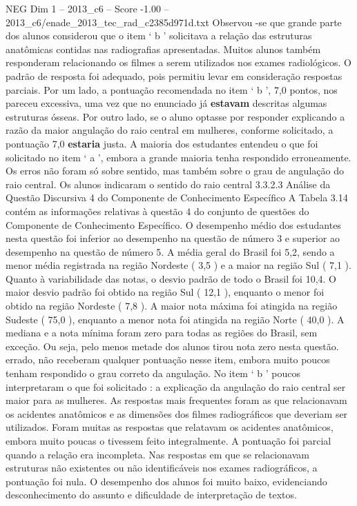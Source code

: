 \begin{textsample}{NEG Dim 1 – 2013\_c6 – Score -1.00 – 2013\_c6/enade\_2013\_tec\_rad\_c2385d971d.txt}
Observou -se que grande parte dos alunos considerou que o item ‘ b ’ solicitava a relação das estruturas anatômicas contidas nas radiografias apresentadas.
Muitos alunos também responderam relacionando os filmes a serem utilizados nos exames radiológicos.
O padrão de resposta foi adequado, pois permitiu levar em consideração respostas parciais.
Por um lado, a pontuação recomendada no item ‘ b ’, 7,0 pontos, nos pareceu excessiva, uma vez que no enunciado já \textbf{estavam} descritas algumas estruturas ósseas.
Por outro lado, se o aluno optasse por responder explicando a razão da maior angulação do raio central em mulheres, conforme solicitado, a pontuação 7,0 \textbf{estaria} justa.
A maioria dos estudantes entendeu o que foi solicitado no item ‘ a ’, embora a grande maioria tenha respondido erroneamente.
Os erros não foram só sobre sentido, mas também sobre o grau de angulação do raio central.
Os alunos indicaram o sentido do raio central 3.3.2.3 Análise da Questão Discursiva 4 do Componente de Conhecimento Específico A Tabela 3.14 contém as informações relativas à questão 4 do conjunto de questões do Componente de Conhecimento Específico.
O desempenho médio dos estudantes nesta questão foi inferior ao desempenho na questão de número 3 e superior ao desempenho na questão de número 5.
A média geral do Brasil foi 5,2, sendo a menor média registrada na região Nordeste ( 3,5 ) e a maior na região Sul ( 7,1 ).
Quanto à variabilidade das notas, o desvio padrão de todo o Brasil foi 10,4.
O maior desvio padrão foi obtido na região Sul ( 12,1 ), enquanto o menor foi obtido na região Nordeste ( 7,8 ).
A maior nota máxima foi atingida na região Sudeste ( 75,0 ), enquanto a menor nota foi atingida na região Norte ( 40,0 ).
A mediana e a nota mínima foram zero para todas as regiões do Brasil, sem exceção.
Ou seja, pelo menos metade dos alunos tirou nota zero nesta questão. errado, não receberam qualquer pontuação nesse item, embora muito poucos tenham respondido o grau correto da angulação.
No item ‘ b ’ poucos interpretaram o que foi solicitado : a explicação da angulação do raio central ser maior para as mulheres.
As respostas mais frequentes foram as que relacionavam os acidentes anatômicos e as dimensões dos filmes radiográficos que deveriam ser utilizados.
Foram muitas as respostas que relatavam os acidentes anatômicos, embora muito poucas o tivessem feito integralmente.
A pontuação foi parcial quando a relação era incompleta.
Nas respostas em que se relacionavam estruturas não existentes ou não identificáveis nos exames radiográficos, a pontuação foi nula.
O desempenho dos alunos foi muito baixo, evidenciando desconhecimento do assunto e dificuldade de interpretação de textos.

\end{textsample}
